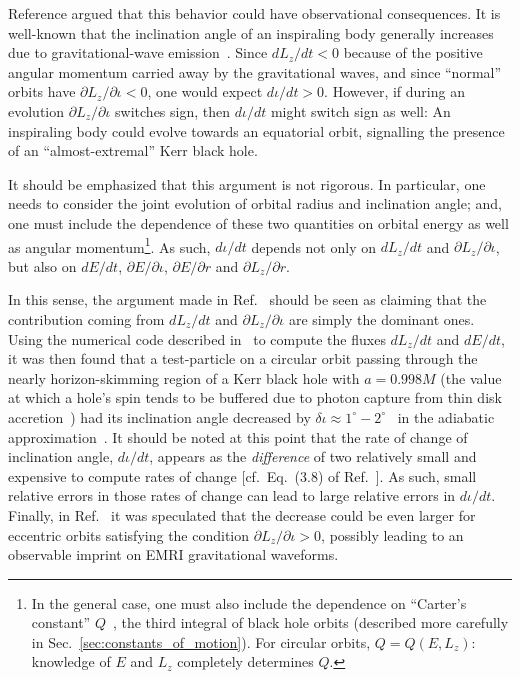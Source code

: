\documentclass[aps,prd,twocolumn,showpacs,groupedaddress,nofootinbib]{revtex4}
\begin{document}
Reference \cite{skimming} argued that this behavior could have
observational consequences.  It is well-known that the inclination
angle of an inspiraling body generally increases due to
gravitational-wave emission~\cite{fintan_circ,first_code}. Since
$dL_z/dt < 0$ because of the positive angular momentum carried away by
the gravitational waves, and since ``normal'' orbits have $\partial
L_z/\partial \iota < 0$, one would expect $d\iota/dt > 0$.  However,
if during an evolution $\partial L_z/\partial \iota$ switches sign,
then $d\iota/dt$ might switch sign as well: An inspiraling body could
evolve towards an equatorial orbit, signalling the presence of an
``almost-extremal'' Kerr black hole.

It should be emphasized that this argument is not rigorous.  In
particular, one needs to consider the joint evolution of orbital
radius and inclination angle; and, one must include the dependence of
these two quantities on orbital energy as well as angular
momentum\footnote{In the general case, one must also include the
dependence on ``Carter's constant'' $Q$~\cite{Carter}, the third integral of black
hole orbits (described more carefully in Sec.\
\ref{sec:constants_of_motion}).  For circular orbits, $Q = Q(E,L_z)$:
knowledge of $E$ and $L_z$ completely determines $Q$.}.  As such,
$d\iota/dt$ depends not only on $dL_z/dt$ and $\partial L_z/\partial
\iota$, but also on $dE/dt$, $\partial E/\partial\iota$, $\partial
E/\partial r$ and $\partial L_z/\partial r$.

In this sense, the argument made in Ref.\ \cite{skimming} should be
seen as claiming that the contribution coming from $dL_z/dt$ and
$\partial L_z/\partial \iota$ are simply the dominant ones. Using the
numerical code described in~\cite{first_code} to compute the fluxes
$dL_z/dt$ and $dE/dt$, it was then found that a test-particle on a
circular orbit passing through the nearly horizon-skimming region of a
Kerr black hole with $a = 0.998M$ (the value at which a hole's spin
tends to be buffered due to photon capture from thin disk
accretion~\cite{thorne_spin}) had its inclination angle decreased by
$\delta\iota\approx1^\circ - 2^\circ$~\cite{skimming} in the adiabatic approximation~\cite{Mino_adiabatic}.  It should be
noted at this point that the rate of change of inclination angle,
$d\iota/dt$, appears as the {\it difference} of two relatively small
and expensive to compute rates of change [cf.\ Eq.\ (3.8) of Ref.\
{\cite{first_code}}].  As such, small relative errors in those rates
of change can lead to large relative errors in $d\iota/dt$.  Finally,
in Ref.\ {\cite{skimming}} it was speculated that the decrease could
be even larger for eccentric orbits satisfying the condition $\partial
L_z/\partial \iota > 0$, possibly leading to an observable imprint on
EMRI gravitational waveforms.
\end{document}
